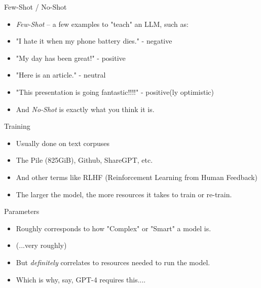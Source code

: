\documentclass{beamer}
\begin{document}
\begin{frame}{Few-Shot / No-Shot}
	\begin{itemize}
		\item \textit{Few-Shot} -- a few examples to "teach" an LLM, such as:
		\pause
		\item "I hate it when my phone battery dies." - negative
		\pause
		\item "My day has been great!" - positive
		\pause
		\item "Here is an article." - neutral
		\pause
		\item "This presentation is going fantastic!!!!" - positive(ly optimistic)
		\pause
		\item And \textit{No-Shot} is exactly what you think it is.
	\end{itemize}
\end{frame}

\begin{frame}{Training}
	\begin{itemize}
		\item Usually done on text corpuses
		\pause
		\item The Pile (825GiB), Github, ShareGPT, etc.
		\pause
		\item And other terms like RLHF (Reinforcement Learning from Human Feedback)
		\pause
		\item The larger the model, the more resources it takes to train or re-train.
	\end{itemize}
\end{frame}

\begin{frame}{Parameters}
	\begin{itemize}
		\item Roughly corresponds to how "Complex" or "Smart" a model is.
		\pause
		\item (...very roughly)
		\pause 
		\item But \textit{definitely} correlates to resources needed to run the model.
		\pause
		\item Which is why, say, GPT-4 requires this....
	\end{itemize}
\end{frame}
\end{document}
